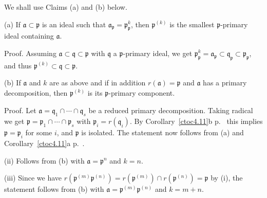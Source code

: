 \documentclass[12pt,letterpaper]{article}%
\newcommand{\mf}{\mathfrak}
\newcommand{\aaa}{\mf a}
\newcommand{\ppp}{\mf p}
\newcommand{\qqq}{\mf q}
\newcommand{\nn}{\noindent}
\begin{document}
We shall use Claims (a) and (b) below.

\nn(a) If $\aaa\subset\ppp$ is an ideal such that $\aaa_\ppp=\ppp_\ppp^k$, then $\ppp^{(k)}$ is the smallest $\ppp$-primary ideal containing $\aaa$.

\nn Proof. Assuming $\aaa\subset\qqq\subset\ppp$ with $\qqq$ a $\ppp$-primary ideal, we get $\ppp^k_\ppp=\aaa_\ppp\subset\qqq_\ppp\subset\ppp_\ppp$, and thus $\ppp^{(k)}\subset\qqq\subset\ppp$.

\nn(b) If $\aaa$ and $k$ are as above and if in addition $r(\aaa)=\ppp$ and $\aaa$ has a primary decomposition, then $\ppp^{(k)}$ is its $\ppp$-primary component.

\nn Proof. Let $\aaa=\qqq_1\cap\cdots\cap\qqq_s$ be a reduced primary decomposition. Taking radical we get $\ppp=\ppp_1\cap\cdots\cap\ppp_s$ with $\ppp_i=r(\qqq_i)$. By Corollary~\ref{ctoc4.11}b p.~\pageref{ctoc4.11} this implies $\ppp=\ppp_i$ for some $i$, and $\ppp$ is isolated. The statement now follows from (a) and Corollary~\ref{ctoc4.11}a p.~\pageref{ctoc4.11}.

\nn(ii) Follows from (b) with $\aaa=\ppp^n$ and $k=n$.

\nn(iii) Since we have $r(\ppp^{(m)}\ppp^{(n)})=r(\ppp^{(m)})\cap r(\ppp^{(n)})=\ppp$ by (i), the statement follows from (b) with $\aaa=\ppp^{(m)}\ppp^{(n)}$ and $k=m+n$.

\begin{comment}
\nn(i') $\ppp^{(n)}$ is the smallest $\ppp$-primary ideal containing $\ppp^n$. Proof: assuming $\ppp^n\subset\qqq\subset\ppp$ with $\qqq$ a $\ppp$-primary ideal, we get $\ppp^n_\ppp\subset\qqq_\ppp\subset\ppp_\ppp$, and thus $\ppp^{(n)}\subset\qqq\subset\ppp$.

\nn(ii) Let $\ppp^n=\qqq_1\cap\cdots\cap\qqq_k$ be a reduced primary decomposition. Taking radical we get $\ppp=\ppp_1\cap\cdots\cap\ppp_k$ with $\ppp_i=r(\qqq_i)$. By Corollary~\ref{ctoc4.11}b p.~\pageref{ctoc4.11} this implies $\ppp=\ppp_i$ for some $i$, and $\ppp$ is isolated. The statement now follows from (a) [with $\aaa=\ppp^n$ and $k=n$] and Corollary~\ref{ctoc4.11}a p.~\pageref{ctoc4.11}.

\nn(iii) We have $r(\ppp^{(m)}\ppp^{(n)})=r(\ppp^{(m)})\cap r(\ppp^{(n)})=\ppp$ by (i). Let $\ppp^{(m)}\ppp^{(n)}=\qqq_1\cap\cdots\cap\qqq_k$ be a reduced primary decomposition. Taking radical we get $\ppp=\ppp_1\cap\cdots\cap\ppp_k$ with $\ppp_i=r(\qqq_i)$. By Corollary~\ref{ctoc4.11}b p.~\pageref{ctoc4.11} this implies $\ppp=\ppp_i$ for some $i$, and $\ppp$ is isolated. The statement follows again from (a) [with $\aaa=\ppp^{(m)}\ppp^{(n)}$ and $k=m+n$] and Corollary~\ref{ctoc4.11}a p.~\pageref{ctoc4.11}.
\end{comment}
\end{document}
